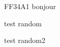  {FF34A1}
 {bonjour}
\begindoc
\abb{\bonjourr}{\bjr}
\linebreak
\beginenum
\item test random
\item test random2
\linebreak
\abb{\coucou}{\cc}
\endenum
\enddoc
